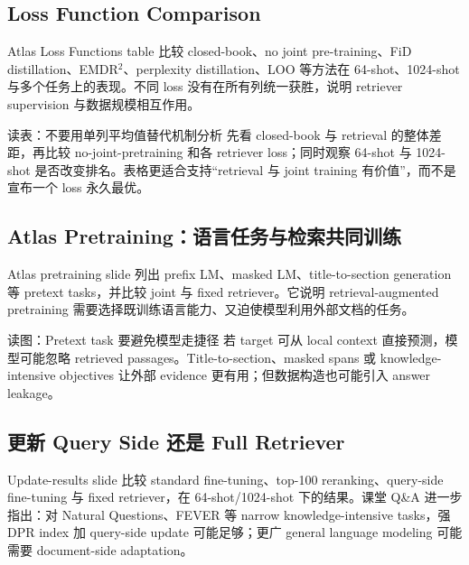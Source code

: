 \subsection{Loss Function Comparison}

Atlas Loss Functions table 比较 closed-book、no joint pre-training、FiD distillation、EMDR$^2$、perplexity distillation、LOO 等方法在 64-shot、1024-shot 与多个任务上的表现。不同 loss 没有在所有列统一获胜，说明 retriever supervision 与数据规模相互作用。


\begin{knowledgebox}{读表：不要用单列平均值替代机制分析}
先看 closed-book 与 retrieval 的整体差距，再比较 no-joint-pretraining 和各 retriever loss；同时观察 64-shot 与 1024-shot 是否改变排名。表格更适合支持“retrieval 与 joint training 有价值”，而不是宣布一个 loss 永久最优。
\end{knowledgebox}

\subsection{Atlas Pretraining：语言任务与检索共同训练}

Atlas pretraining slide 列出 prefix LM、masked LM、title-to-section generation 等 pretext tasks，并比较 joint 与 fixed retriever。它说明 retrieval-augmented pretraining 需要选择既训练语言能力、又迫使模型利用外部文档的任务。


\begin{knowledgebox}{读图：Pretext task 要避免模型走捷径}
若 target 可从 local context 直接预测，模型可能忽略 retrieved passages。Title-to-section、masked spans 或 knowledge-intensive objectives 让外部 evidence 更有用；但数据构造也可能引入 answer leakage。
\end{knowledgebox}

\subsection{更新 Query Side 还是 Full Retriever}

Update-results slide 比较 standard fine-tuning、top-100 reranking、query-side fine-tuning 与 fixed retriever，在 64-shot/1024-shot 下的结果。课堂 Q\&A 进一步指出：对 Natural Questions、FEVER 等 narrow knowledge-intensive tasks，强 DPR index 加 query-side update 可能足够；更广 general language modeling 可能需要 document-side adaptation。

